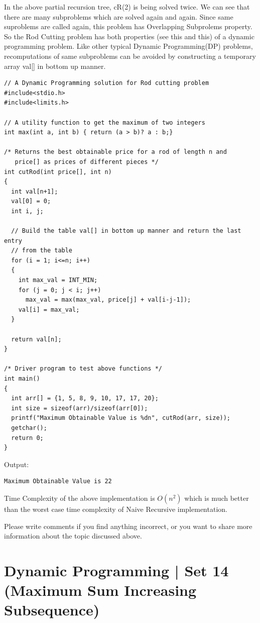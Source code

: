In the above partial recursion tree, cR(2) is being solved twice. We can see
that there are many subproblems which are solved again and again. Since same
suproblems are called again, this problem has Overlapping Subprolems
property. So the Rod Cutting problem has both properties (see this and this)
of a dynamic programming problem. Like other typical Dynamic Programming(DP)
problems, recomputations of same subproblems can be avoided by constructing
a temporary array val[] in bottom up manner.
\begin{lstlisting}[style=raycppnewsnippet]
// A Dynamic Programming solution for Rod cutting problem
#include<stdio.h>
#include<limits.h>
 
// A utility function to get the maximum of two integers
int max(int a, int b) { return (a > b)? a : b;}
 
/* Returns the best obtainable price for a rod of length n and
   price[] as prices of different pieces */
int cutRod(int price[], int n)
{
  int val[n+1];
  val[0] = 0;
  int i, j;
 
  // Build the table val[] in bottom up manner and return the last entry
  // from the table
  for (i = 1; i<=n; i++)
  {
    int max_val = INT_MIN;
    for (j = 0; j < i; j++)
      max_val = max(max_val, price[j] + val[i-j-1]);
    val[i] = max_val;
  }
 
  return val[n];
}
 
/* Driver program to test above functions */
int main()
{
  int arr[] = {1, 5, 8, 9, 10, 17, 17, 20};
  int size = sizeof(arr)/sizeof(arr[0]);
  printf("Maximum Obtainable Value is %dn", cutRod(arr, size));
  getchar();
  return 0;
}
\end{lstlisting}
Output:
\begin{lstlisting}[style=rayio]
Maximum Obtainable Value is 22
\end{lstlisting}
Time Complexity of the above implementation is $O(n^2)$ which is much better
than the worst case time complexity of Naive Recursive implementation.

Please write comments if you find anything incorrect, or you want to share
more information about the topic discussed above.


\section{Dynamic Programming | Set 14 (Maximum Sum Increasing Subsequence)
  \label{secGFGDPSet14MaxSumIncreSunseq}}


